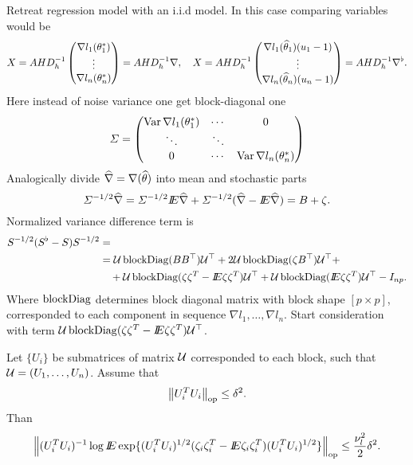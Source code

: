 Retreat regression model with an i.i.d model. In this case comparing variables would be   
\[
X = A H D^{-1}_{h} 
 \begin{pmatrix}
  \nabla l_1 (\theta^*_1) \\
  \vdots  \\
  \nabla l_n (\theta^*_n) 
 \end{pmatrix} = 
 A H D^{-1}_{h} \nabla,
 \quad
 X = A H D^{-1}_{h} 
 \begin{pmatrix}
  \nabla l_1 (\widehat{\theta}_1) (u_1 - 1) \\
  \vdots  \\
  \nabla l_n (\widehat{\theta}_n) (u_n - 1)
 \end{pmatrix} = 
 A H D^{-1}_{h} \nabla^{\flat}.
\]
Here instead of noise variance one get block-diagonal one 
\[
\varSigma = \begin{pmatrix}
 \operatorname{Var}  \nabla l_1 (\theta^*_1)  & \cdots & 0  \\
  \ddots &  \ddots  \\
 0 & \cdots & \operatorname{Var} \nabla l_n (\theta^*_n) 
 \end{pmatrix} 
\] 
Analogically divide $\widehat{\nabla} = \nabla(\widehat{\theta})$ into mean and stochastic parts
\[
\varSigma^{-1/2} \widehat{\nabla} = \varSigma^{-1/2} I\!\!E \widehat{\nabla} + \varSigma^{-1/2} ( \widehat{\nabla} -  I\!\!E \widehat{\nabla} )  = 
B + \zeta.
\]
Normalized variance difference term is 
\begin{align*}
\label{SmatrixDiff}
S^{-1/2} (S^{\flat} - S) S^{-1/2} &=\\
 &=\mathcal{U} \operatorname{blockDiag}(BB^{\top})\mathcal{U}^{\top} + 2\mathcal{U} \operatorname{blockDiag}(\zeta B^{\top})\mathcal{U}^{\top} +\\
 &\quad+ \mathcal{U} \operatorname{blockDiag}(\zeta \zeta^{T}   -  I\!\!E \zeta \zeta^{T}) \mathcal{U}^{\top} + \mathcal{U} \operatorname{blockDiag}(I\!\!E \zeta \zeta^{T}) \mathcal{U}^{\top}  - I_{np}.
\end{align*}  
Where $\operatorname{blockDiag}$ determines block diagonal matrix with block shape $[p\times p]$, corresponded to each component in  sequence $\nabla l_1,\ldots,\nabla l_n$. 
Start consideration with term $\mathcal{U} \operatorname{blockDiag}(\zeta \zeta^{T}   -  I\!\!E \zeta \zeta^{T}) \mathcal{U}^{\top} $. 
\begin{lemma}
Let $\{U_i\}$ be submatrices of matrix $\mathcal{U}$ corresponded to each block, such that $\mathcal{U} = (U_1,\ldots, U_n)$. Assume that 
\[
\left\Vert U_i^T U_i  \right\Vert_{\operatorname{op}} \leq \delta^2. 
\]
Than
\[
\left\Vert  
(U_i^{T} U_i)^{-1}
\log I\!\!E \exp \{ (U_i^{T} U_i)^{1/2}  (\zeta_i \zeta_i^{T}   -  I\!\!E \zeta_i \zeta_i^{T}) (U_i^{T} U_i)^{1/2}  
\}  \right\Vert_{\operatorname{op}} \leq \frac{\nu_l^2}{2}  \delta^2.
\]
\end{lemma} 

